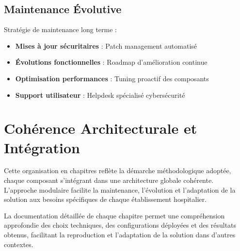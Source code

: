 \subsection{Maintenance Évolutive}

Stratégie de maintenance long terme :
\begin{itemize}
    \item \textbf{Mises à jour sécuritaires} : Patch management automatisé
    \item \textbf{Évolutions fonctionnelles} : Roadmap d'amélioration continue
    \item \textbf{Optimisation performances} : Tuning proactif des composants
    \item \textbf{Support utilisateur} : Helpdesk spécialisé cybersécurité
\end{itemize}

\section{Cohérence Architecturale et Intégration}

Cette organisation en chapitres reflète la démarche méthodologique adoptée, chaque composant s'intégrant dans une architecture globale cohérente. L'approche modulaire facilite la maintenance, l'évolution et l'adaptation de la solution aux besoins spécifiques de chaque établissement hospitalier.

La documentation détaillée de chaque chapitre permet une compréhension approfondie des choix techniques, des configurations déployées et des résultats obtenus, facilitant la reproduction et l'adaptation de la solution dans d'autres contextes.

\newpage
